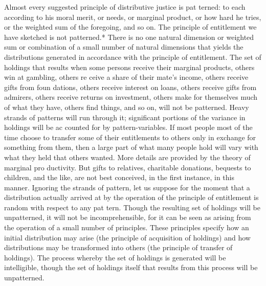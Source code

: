 \documentclass[11pt,openany]{book}
\begin{document}
Almost every suggested principle of distributive justice is pat terned: to each according to his moral merit, or needs, or marginal product, or how hard he tries, or the weighted sum of the foregoing, and so on. The principle of entitlement we have sketched is not patterned.* There is no one natural dimension or weighted sum or combination of a small number of natural dimensions that yields the distributions generated in accordance with the principle of entitlement. The set of holdings that results when some persons receive their marginal products, others win at gambling, others re ceive a share of their mate's income, others receive gifts from foun dations, others receive interest on loans, others receive gifts from admirers, others receive returns on investment, others make for themselves much of what they have, others find things, and so on, will not be patterned. Heavy strands of patterns will run through it; significant portions of the variance in holdings will be ac counted for by pattern-variables. If most people most of the time choose to transfer some of their entitlements to others only in exchange for something from them, then a large part of what many people hold will vary with what they held that others wanted. More details are provided by the theory of marginal pro ductivity. But gifts to relatives, charitable donations, bequests to children, and the like, are not best conceived, in the first instance, in this manner. Ignoring the strands of pattern, let us suppose for the moment that a distribution actually arrived at by the operation of the principle of entitlement is random with respect to any pat tern. Though the resulting set of holdings will be unpatterned, it will not be incomprehensible, for it can be seen as arising from the operation of a small number of principles. These principles specify how an initial distribution may arise (the principle of acquisition of holdings) and how distributions may be transformed into others (the principle of transfer of holdings). The process whereby the set of holdings is generated will be intelligible, though the set of holdings itself that results from this process will be unpatterned. 
\end{document}
